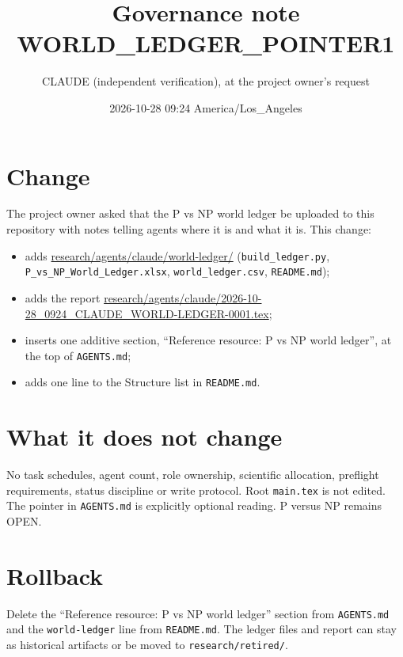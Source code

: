 \documentclass[11pt]{article}
\title{Governance note WORLD\_LEDGER\_POINTER1}
\author{CLAUDE (independent verification), at the project owner's request}
\date{2026-10-28 09:24 America/Los\_Angeles}
\begin{document}
\maketitle

\section*{Change}
The project owner asked that the P vs NP world ledger be uploaded to this repository with notes telling
agents where it is and what it is. This change:
\begin{itemize}
  \item adds \url{research/agents/claude/world-ledger/} (\texttt{build\_ledger.py},
        \texttt{P\_vs\_NP\_World\_Ledger.xlsx}, \texttt{world\_ledger.csv}, \texttt{README.md});
  \item adds the report \url{research/agents/claude/2026-10-28_0924_CLAUDE_WORLD-LEDGER-0001.tex};
  \item inserts one additive section, ``Reference resource: P vs NP world ledger'', at the top of
        \texttt{AGENTS.md};
  \item adds one line to the Structure list in \texttt{README.md}.
\end{itemize}

\section*{What it does not change}
No task schedules, agent count, role ownership, scientific allocation, preflight requirements, status
discipline or write protocol. Root \texttt{main.tex} is not edited. The pointer in \texttt{AGENTS.md}
is explicitly optional reading. P versus NP remains OPEN.

\section*{Rollback}
Delete the ``Reference resource: P vs NP world ledger'' section from \texttt{AGENTS.md} and the
\texttt{world-ledger} line from \texttt{README.md}. The ledger files and report can stay as historical
artifacts or be moved to \texttt{research/retired/}.
\end{document}
